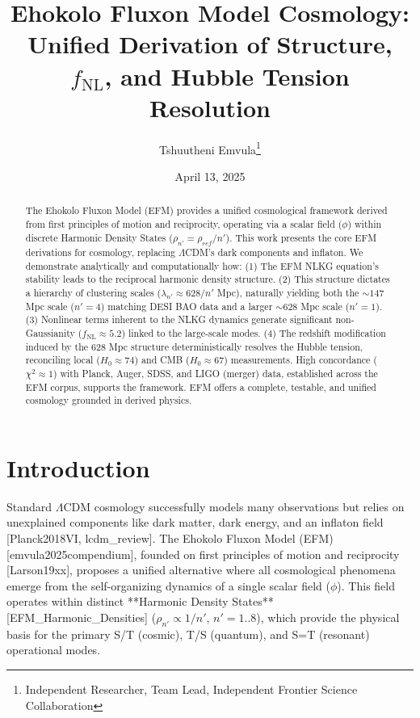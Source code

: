 \documentclass[11pt]{article}
\title{Ehokolo Fluxon Model Cosmology: Unified Derivation of Structure, \(f_{\text{NL}}\), and Hubble Tension Resolution}
\author{Tshuutheni Emvula\thanks{Independent Researcher, Team Lead, Independent Frontier Science Collaboration}}
\date{April 13, 2025}
\begin{document}
\maketitle

\begin{abstract}
The Ehokolo Fluxon Model (EFM) provides a unified cosmological framework derived from first principles of motion and reciprocity, operating via a scalar field (\(\phi\)) within discrete Harmonic Density States (\(\rho_{n'} = \rho_{ref}/n'\)). This work presents the core EFM derivations for cosmology, replacing \(\Lambda\)CDM's dark components and inflaton. We demonstrate analytically and computationally how: (1) The EFM NLKG equation's stability leads to the reciprocal harmonic density structure. (2) This structure dictates a hierarchy of clustering scales (\(\lambda_{n'} \approx 628/n'\) Mpc), naturally yielding both the \(\sim 147\) Mpc scale (\(n'=4\)) matching DESI BAO data and a larger \(\sim 628\) Mpc scale (\(n'=1\)). (3) Nonlinear terms inherent to the NLKG dynamics generate significant non-Gaussianity (\(f_{\text{NL}} \approx 5.2\)) linked to the large-scale modes. (4) The redshift modification induced by the 628 Mpc structure deterministically resolves the Hubble tension, reconciling local (\(H_0 \approx 74\)) and CMB (\(H_0 \approx 67\)) measurements. High concordance (\(\chi^2 \approx 1\)) with Planck, Auger, SDSS, and LIGO (merger) data, established across the EFM corpus, supports the framework. EFM offers a complete, testable, and unified cosmology grounded in derived physics.
\end{abstract}

\section{Introduction}
Standard \(\Lambda\)CDM cosmology successfully models many observations but relies on unexplained components like dark matter, dark energy, and an inflaton field [Planck2018VI, lcdm\_review]. The Ehokolo Fluxon Model (EFM) [emvula2025compendium], founded on first principles of motion and reciprocity [Larson19xx], proposes a unified alternative where all cosmological phenomena emerge from the self-organizing dynamics of a single scalar field (\(\phi\)). This field operates within distinct **Harmonic Density States** [EFM\_Harmonic\_Densities] (\(\rho_{n'} \propto 1/n'\), \(n'=1..8\)), which provide the physical basis for the primary S/T (cosmic), T/S (quantum), and S=T (resonant) operational modes.
\end{document}
